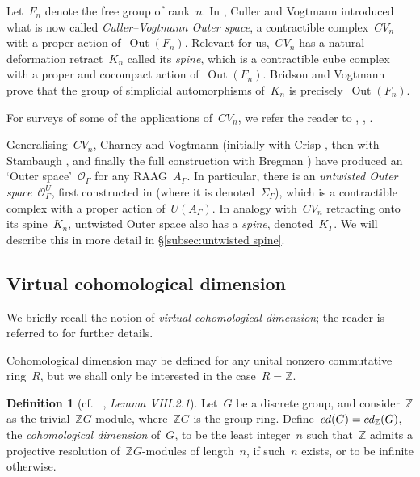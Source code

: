 \documentclass[11pt]{amsart}
\theoremstyle{definition}
\theoremstyle{definition}
\theoremstyle{definition}
\theoremstyle{definition}
\newtheorem{definition}[theorem]{Definition}
\newcommand{\raag}{A_\Gamma} %
\newcommand{\uag}{U(A_{\Gamma})} %
\newcommand{\spine}{K_{\Gamma}} %
\begin{document}
Let~$F_n$ denote the free group of rank~$n$. In \cite{CullerVogtmannOuterSpace86}, Culler and Vogtmann introduced what is now called \emph{Culler--Vogtmann Outer space}, a contractible complex~$CV_n$ with a proper action of~$\operatorname{Out}(F_n)$. Relevant for us,~$CV_n$ has a natural deformation retract~$K_n$ called its \emph{spine}, which is a contractible cube complex with a proper and cocompact action of~$\operatorname{Out}(F_n)$. Bridson and Vogtmann \cite{BridsonVogtmannSymsOuterSpace01} prove that the group of simplicial automorphisms of~$K_n$ is precisely~$\operatorname{Out}(F_n)$.

For surveys of some of the applications of~$CV_n$, we refer the reader to \cite{VogtmannOuterSpaceSurvey02}, \cite{VogtmannOuterSpaceSurvey18}, \cite{CroweHelmsVogtmannOuterSpaceSurvey25}.

Generalising~$CV_n$, Charney and Vogtmann (initially with Crisp \cite{CharneyCrispVogtmann2dimRAAGs07}, then with Stambaugh \cite{CharneyStambaughVogtmannUntwistedOuterSpace17}, and finally the full construction with Bregman \cite{BregmanCharneyVogtmannOuterSpaceRAAGs23}) have produced an `Outer space'~$\mathcal{O}_\Gamma$ for any RAAG~$\raag$. In particular, there is an \emph{untwisted Outer space}~$\mathcal{O}_\Gamma^U$, first constructed in \cite{CharneyStambaughVogtmannUntwistedOuterSpace17} (where it is denoted~$\Sigma_\Gamma$), which is a contractible complex with a proper action of~$\uag$. In analogy with~$CV_n$ retracting onto its spine~$K_n$, untwisted Outer space also has a \emph{spine}, denoted~$\spine$. We will describe this in more detail in \S\ref{subsec:untwisted spine}.

\subsection{Virtual cohomological dimension}\label{subsec:vcd}

We briefly recall the notion of \emph{virtual cohomological dimension}; the reader is referred to \cite{BrownCohomologyofGroups1stEd82} for further details.

Cohomological dimension may be defined for any unital nonzero commutative ring~$R$, but we shall only be interested in the case~$R = \mathbb{Z}$.

\begin{definition}[cf. ~\cite{BrownCohomologyofGroups1stEd82}, \emph{Lemma VIII.2.1}]
    Let~$G$ be a discrete group, and consider~$\mathbb{Z}$ as the trivial~$\mathbb{Z}G$-module, where~$\mathbb{Z}G$ is the group ring. Define~$\textsc{cd}(G) = \textsc{cd}_{\mathbb{Z}}(G)$, the \emph{cohomological dimension} of~$G$, to be the least integer~$n$ such that~$\mathbb{Z}$ admits a projective resolution of~$\mathbb{Z}G$-modules of length~$n$, if such~$n$ exists, or to be infinite otherwise.
\end{definition}
\end{document}
